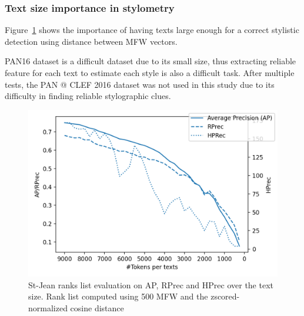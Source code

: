 \subsubsection{Text size importance in stylometry}

Figure~\ref{img:degradation} shows the importance of having texts large enough for a correct stylistic detection using distance between MFW vectors.

PAN16 dataset is a difficult dataset due to its small size, thus extracting reliable feature for each text to estimate each style is also a difficult task.
After multiple tests, the PAN @ CLEF 2016 dataset was not used in this study due to its difficulty in finding reliable stylographic clues.

\begin{figure}
  \includegraphics[width=\linewidth]{img/degradation.png}
  \caption{St-Jean ranks list evaluation on AP, RPrec and HPrec over the text size. Rank list computed using 500 MFW and the zscored-normalized cosine distance}
  \label{img:degradation}
\end{figure}

